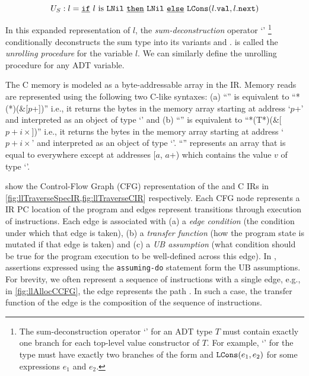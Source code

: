 \begin{equation}
\label{eqn:specDeconstruct}
U_S: l = \underline{\tt if}\ l\ \mathrm{is}\ {\tt LNil} \  \underline{\tt then}\ {\tt LNil} \  \underline{\tt else}\ {\tt LCons}(l.{{{\tt val}}}, l.{{{\tt next}}})
\end{equation}

In this expanded representation of $l$,
the {\em sum-deconstruction} operator `\sumDtor{}'
\footnote{The sum-deconstruction operator `\sumDtor{}' for an ADT
type $T$ must contain exactly one branch for each top-level value constructor of $T$.
For example, `\sumDtor{}' for the  type must have exactly two branches
of the form  and ${\tt LCons}(e_1,e_2)$ for some expressions $e_1$ and $e_2$.}
conditionally deconstructs the sum type into its variants  and .
 is called the {\em unrolling procedure} for the  variable $l$.
We can similarly define the unrolling procedure for any ADT variable.

The C memory is modeled as a byte-addressable array \mem{} in the IR.
Memory reads are represented using the following two C-like syntaxes:
(a) ``'' is equivalent to ``*(*)(\&\mem{}[$p$+])''
i.e., it returns the bytes in the memory array \mem{} starting at address `$p$+'
and interpreted as an object of type `' and
(b) ``'' is equivalent to ``*(T*)(\&\mem{}[$p+i\times$])''
i.e., it returns the bytes in the memory array \mem{} starting at address `$p+i\times$'
and interpreted as an object of type `'.
``'' represents an array that is equal to \mem{} everywhere except at addresses
[$a$, $a$+) which contains the value $v$ of type `'.

 show the Control-Flow Graph (CFG) representation
of the \SpecL{} and C IRs in \cref{fig:llTraverseSpecIR,fig:llTraverseCIR} respectively.
Each CFG node represents a IR PC location of the program and edges represent
transitions through execution of instructions.
Each edge is associated with
(a) a {\em edge condition} (the condition under which that edge is taken),
(b) a {\em transfer function} (how the program state is mutated if that edge is taken) and
(c) a {\em UB assumption} (what condition should be true for the program execution
to be well-defined across this edge).
In \SpecL{}, assertions expressed using the {\tt assuming-do} statement
form the UB assumptions.
For brevity, we often represent a sequence of instructions with a single edge, e.g.,
in \cref{fig:llAllocCCFG}, the edge  represents the path .
In such a case, the transfer function of the edge is the composition of the sequence of instructions.


